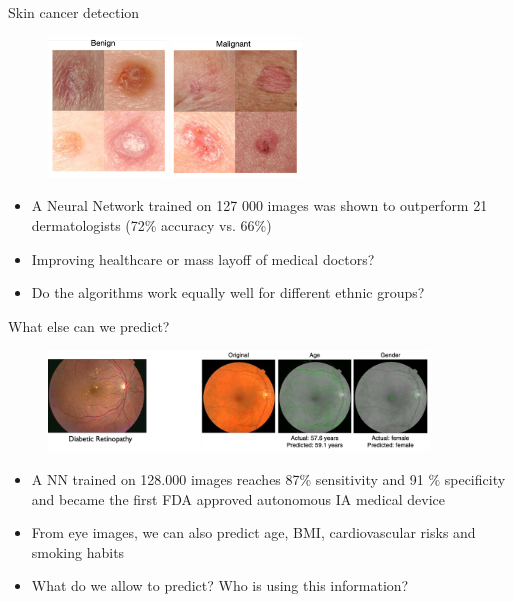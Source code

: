 \documentclass[xcolor=pdftex,dvipsnames,table]{beamer}
\begin{document}
\begin{frame}{Skin cancer detection}
\begin{figure}[htb]
\includegraphics[width=0.6\textwidth]{../graphics/dermatology.pdf}
\end{figure}
\begin{itemize}
\item<1-> A Neural Network trained on 127 000 images was shown to outperform 21 dermatologists (72\% accuracy vs. 66\%) \cite{Esteva2017} 
\item<2-> Improving healthcare or mass layoff of medical doctors?
\item<3-> Do the algorithms work equally well for different ethnic groups? 
\end{itemize}
\end{frame}

\begin{frame}{What else can we predict?}
\begin{figure}[htb]
\includegraphics[width=0.9\textwidth]{../graphics/retinopathy.pdf}
\end{figure}
\begin{itemize}
\item<1-> A NN trained on 128.000 images reaches 87\% sensitivity and 91 \% specificity and became the first FDA approved autonomous IA medical device \cite{Abramoff2018}
\item<2-> From eye images, we can also predict age, BMI, cardiovascular risks and smoking habits \cite{Poplin2018}
\item<3-> What do we allow to predict? Who is using this information?
\end{itemize}
\end{frame}
\end{document}
